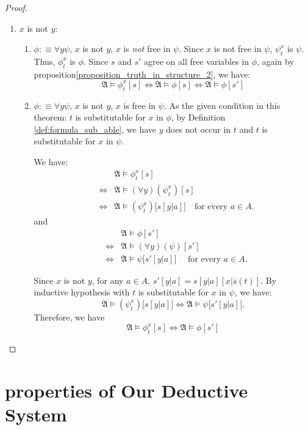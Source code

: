 \documentclass[11pt,letterpaper]{book}
\theoremstyle{definition}
\begin{document}
\begin{proof}
\begin{enumerate}
\begin{enumerate}
\item{$x$ is not $y$:}
\begin{enumerate}
\item{$\phi:\equiv \forall y \psi$, $x$ is not $y$, $x$ is \emph{not}
free in $\psi$. Since $x$ is not free in $\psi$, $\psi_t ^x $ is $\psi$.
Thus, $\phi_t ^x$ is $\phi$. Since $s$ and $s'$ agree on all free
variables in $\phi$, again by
proposition\ref{proposition_truth_in_structure_2}, we have:
$$ \mathfrak{A} \models \phi_t ^x [s] \iff \mathfrak{A} \models \phi[s]
\iff \mathfrak{A} \models \phi[s'] $$


}
\item{$\phi:\equiv \forall y \psi$, $x$ is not $y$, $x$ is free in
$\psi$. As the given condition in this theorem: $t$ is substitutable for
$x$ in $\phi$, by Definition \ref{def:formula_sub_able}, we have $y$
does not occur in $t$ and $t$ is substitutable for $x$ in $\psi$.

We have:
\begin{eqnarray*}
& & \mathfrak{A} \models \phi_t ^x [s] \\
& \iff & \mathfrak{A} \models (\forall y ) (\psi_t ^x)[s] \\
& \iff & \mathfrak{A} \models (\psi_t ^x)\big[ s[y|a] \big] \quad \text{
for every } a \in A .
\end{eqnarray*}
and
\begin{eqnarray*}
& & \mathfrak{A} \models \phi[s'] \\
& \iff & \mathfrak{A} \models (\forall y) (\psi) [s'] \\
& \iff & \mathfrak{A} \models \psi\big[ s'[y|a] \big] \quad \text{ for
every } a \in A .
\end{eqnarray*}

Since $x$ is not $y$, for any $a \in A$, $s'[y|a] = s[y|a]
[x|\overline{s}(t)]$. By inductive hypothesis with $t$ is substitutable
for $x$ in $\psi$, we have:
$$ \mathfrak{A} \models (\psi_t ^x)\big[ s[y|a] \big] \iff \mathfrak{A}
\models \psi\big[ s'[y|a] \big] . $$
Therefore, we have $$\mathfrak{A} \models \phi_t ^x [s] \iff
\mathfrak{A} \models \phi[s'] $$
}
\end{enumerate}
\end{enumerate}
\end{enumerate}

\end{proof}


\section{properties of Our Deductive System}
\end{document}
